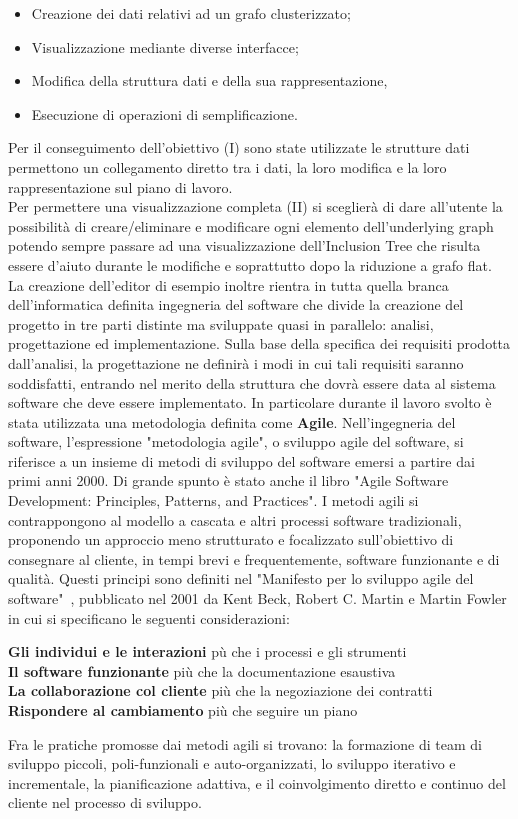 {\newpage
\begin{itemize}
	\item[I] Creazione dei dati relativi ad un grafo clusterizzato;
	\item[II] Visualizzazione mediante diverse interfacce;
	\item[III] Modifica della struttura dati e della sua rappresentazione,
	\item[IV] Esecuzione di operazioni di semplificazione.
\end{itemize}
Per il conseguimento dell'obiettivo (I) sono state utilizzate le strutture dati permettono un collegamento diretto tra i dati, la loro modifica e la loro rappresentazione sul piano di lavoro.\\
Per permettere una visualizzazione completa (II) si sceglierà di dare all'utente la possibilità di creare/eliminare e modificare ogni elemento dell'underlying graph potendo sempre passare ad una visualizzazione dell'Inclusion Tree che risulta essere d'aiuto durante le modifiche e soprattutto dopo la riduzione a grafo flat.
La creazione dell'editor di esempio inoltre rientra in tutta quella branca dell'informatica definita ingegneria del software che divide la creazione del progetto in tre parti distinte ma sviluppate quasi in parallelo: analisi, progettazione ed implementazione. Sulla base della specifica dei requisiti prodotta dall'analisi, la progettazione ne definir\`a i modi in cui tali requisiti saranno soddisfatti, entrando nel merito della struttura che dovr\`a essere data al sistema software che deve essere implementato. In particolare durante il lavoro svolto \`e stata utilizzata una metodologia definita come \textbf{Agile}.
Nell'ingegneria del software, l'espressione "metodologia agile", o sviluppo agile del software, si riferisce a un insieme di metodi di sviluppo del software emersi a partire dai primi anni 2000. Di grande spunto \`e stato anche il libro "Agile Software Development: Principles, Patterns, and Practices"\cite{AG:02}. I metodi agili si contrappongono al modello a cascata e altri processi software tradizionali, proponendo un approccio meno strutturato e focalizzato sull'obiettivo di consegnare al cliente, in tempi brevi e frequentemente, software funzionante e di qualit\`a.
Questi principi sono definiti nel "Manifesto per lo sviluppo agile del software"~\cite{agile2001},
pubblicato nel 2001 da Kent Beck, Robert C. Martin e Martin Fowler in cui si specificano le seguenti considerazioni:\\
\begin{center}
	\textbf{Gli individui e le interazioni} p\`u che i processi e gli strumenti\\
	\textbf{Il software funzionante} pi\`u che la documentazione esaustiva\\
	\textbf{La collaborazione col cliente} pi\`u che la negoziazione dei contratti\\
	\textbf{Rispondere al cambiamento} pi\`u che seguire un piano\\
\end{center}

Fra le pratiche promosse dai metodi agili si trovano: la formazione di team di sviluppo piccoli, poli-funzionali e auto-organizzati, lo sviluppo iterativo e incrementale, la pianificazione adattiva, e il coinvolgimento diretto e continuo del cliente nel processo di sviluppo.

}
